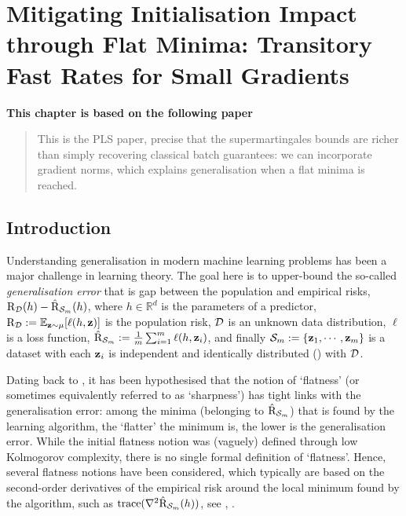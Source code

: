 \chapter[Mitigating Initialisation Impact through Flat Minima: Transitory Fast Rates for Small Gradients]{Mitigating Initialisation Impact through Flat Minima: Transitory Fast Rates for Small Gradients}
\label{chap:gen-flat-minima}
\addchapterlof
\addchapterloa
\addchapterloe
 
\vspace{-2.0cm}
\begin{center}
\textbf{This chapter is based on the following paper}\\[-0.1cm]
\end{center}


\vspace{0.2cm}
\minitoc

\begin{abstract}
\vspace{-0.2cm}
This is the PLS paper, precise that the supermartingales bounds are richer than simply recovering classical batch guarantees: we can incorporate gradient norms, which explains generalisation when a flat minima is reached.
\end{abstract}

\newpage

\section{Introduction}

Understanding generalisation in modern machine learning problems has been a major challenge in learning theory.
The goal here is to upper-bound the so-called \emph{generalisation error} that is gap between the population and empirical risks, $\text{R}_{\mathcal{D}}(h) - \hat{\text{R}}_{\mathcal{S}_m}(h)$, where $h \in \mathbb{R}^d$ is the parameters of a predictor, $\text{R}_{\mathcal{D}}:= \operatorname*{\mathbb{E}}_{\mathbf{z}\sim \mu}[\ell(h,\mathbf{z})]$ is the population risk, $\mathcal{D}$ is an unknown data distribution, $\ell$ is a loss function, $\hat{\text{R}}_{\mathcal{S}_m} := \frac{1}{m}\sum_{i=1}^{m} \ell(h,\mathbf{z}_{i})$, and finally $\mathcal{S}_m:= \{\mathbf{z}_1,\cdots,\mathbf{z}_m\}$ is a dataset with each $\mathbf{z}_i$ is independent and identically distributed (\iid) with $\mathcal{D}$. 


Dating back to \citet{hochreiter1997flat}, it has been hypothesised that the notion of `flatness' (or sometimes equivalently referred to as `sharpness') has tight links with the generalisation error: among the minima (belonging to $\hat{\text{R}}_{\mathcal{S}_m}$) that is found by the learning algorithm, the `flatter' the minimum is, the lower is the generalisation error.
While the initial flatness notion was (vaguely) defined through low Kolmogorov complexity, there is no single formal definition of `flatness'.
Hence, several flatness notions have been considered, which typically are based on the second-order derivatives of the empirical risk around the local minimum found by the algorithm, such as $\mathrm{trace}(\nabla^2 \hat{\text{R}}_{\mathcal{S}_m}(h))$, see \eg, \citet{jastrzkebski2017three, wen2023sharpness}.


